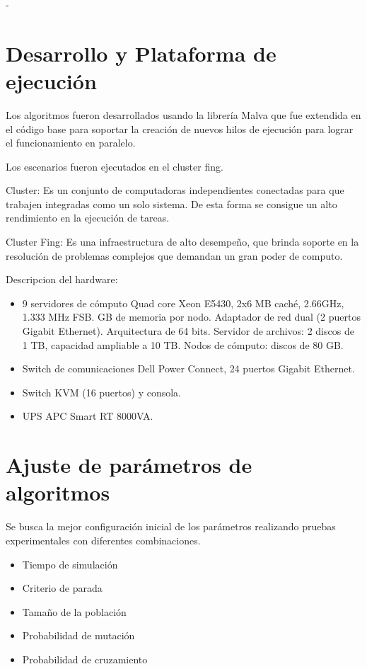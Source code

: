 -




\section{Desarrollo y Plataforma de ejecución }
Los algoritmos fueron desarrollados usando la librería Malva que fue extendida en el código base para soportar la creación de nuevos hilos de ejecución para lograr el funcionamiento en paralelo.


Los escenarios fueron ejecutados en el cluster fing.

Cluster: Es un conjunto de computadoras independientes conectadas para que trabajen integradas como un solo sistema. De esta forma se consigue un alto rendimiento en la ejecución de tareas. 

Cluster Fing: Es una infraestructura de alto desempeño, que brinda soporte en la resolución de problemas complejos que demandan un gran poder de computo.

Descripcion del hardware: 
\begin{itemize}
	\item 9 servidores de cómputo
	\subitem Quad core Xeon E5430, 2x6 MB caché, 2.66GHz, 1.333 MHz FSB.
	 GB de memoria por nodo.
	\subitem Adaptador de red dual (2 puertos Gigabit Ethernet).
	\subitem  Arquitectura de 64 bits.
	\subitem Servidor de archivos: 2 discos de 1 TB, capacidad ampliable a 10 TB.
	\subitem Nodos de cómputo: discos de 80 GB.
	\item Switch de comunicaciones
	\subitem Dell Power Connect, 24 puertos Gigabit Ethernet.
	\item Switch KVM (16 puertos) y consola.
	\item UPS APC Smart RT 8000VA.
\end{itemize}

\section{Ajuste de parámetros de algoritmos}
Se busca la mejor configuración inicial de los parámetros realizando pruebas experimentales con diferentes combinaciones.  

\begin{itemize}
	\item Tiempo de simulación	
	\item Criterio de parada
	\item Tamaño de la población
	\item Probabilidad de mutación
	\item Probabilidad de cruzamiento
\end{itemize}

